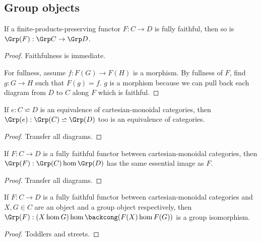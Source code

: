 \subsection{Group objects}


\begin{proposition}
  \label{0-full-faithful-grp}
  \uses{}
  \leanok

  If a finite-products-preserving functor $F : C \to D$ is fully faithful, then so is $\Grp(F) : \Grp C \to \Grp D$.
\end{proposition}
\begin{proof}
  \uses{}
  \leanok

  Faithfulness is immediate.

  For fullness, assume $f : F(G) \to F(H)$ is a morphism. By fullness of $F$, find $g : G \to H$ such that $F(g) = f$. $g$ is a morphism because we can pull back each diagram from $D$ to $C$ along $F$ which is faithful.
\end{proof}


\begin{proposition}
  \label{0-grp-equiv}
  \uses{}
  \leanok

  If $e : C \backsimeq D$ is an equivalence of cartesian-monoidal categories, then $\Grp(e) : \Grp(C) \backsimeq \Grp(D)$ too is an equivalence of categories.
\end{proposition}
\begin{proof}
  \uses{}
  \leanok

  Transfer all diagrams.
\end{proof}


\begin{proposition}
  \label{0-ess-image-grp}
  \uses{}
  \leanok

  If $F : C \to D$ is a fully faithful functor between cartesian-monoidal categories, then $\Grp(F) : \Grp(C) \hom \Grp(D)$ has the same essential image as $F$.
\end{proposition}
\begin{proof}

  Transfer all diagrams.
\end{proof}


\begin{lemma}
  \label{0-full-faithful-grp-hom}
  \leanok

  If $F : C \to D$ is a fully faithful functor between cartesian-monoidal categories and $X, G \in C$ are an object and a group object respectively,
  then $\Grp(F) : (X \hom G) \hom \backcong (F(X) \hom F(G))$ is a group isomorphism.
\end{lemma}
\begin{proof}
  \uses{}
  \leanok

  Toddlers and streets.
\end{proof}
